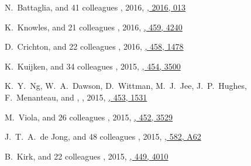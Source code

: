 \begin{etaremune}
\item
N.~Battaglia, and 41 colleagues
,
2016, \href{https://ui.adsabs.harvard.edu/abs/2016JCAP...08..013B}{\jcap, 2016, 013}

\item
K.~Knowles, and 21 colleagues
,
2016, \href{https://ui.adsabs.harvard.edu/abs/2016MNRAS.459.4240K}{\mnras, 459, 4240}

\item
D.~Crichton, and 22 colleagues
,
2016, \href{https://ui.adsabs.harvard.edu/abs/2016MNRAS.458.1478C}{\mnras, 458, 1478}

\item
K.~Kuijken, and 34 colleagues
,
2015, \href{https://ui.adsabs.harvard.edu/abs/2015MNRAS.454.3500K}{\mnras, 454, 3500}

\item
K.~Y.~Ng, W.~A.~Dawson, D.~Wittman, M.~J.~Jee, J.~P.~Hughes, F.~Menanteau, and \myself,
,
2015, \href{https://ui.adsabs.harvard.edu/abs/2015MNRAS.453.1531N}{\mnras, 453, 1531}

\item
M.~Viola, and 26 colleagues
,
2015, \href{https://ui.adsabs.harvard.edu/abs/2015MNRAS.452.3529V}{\mnras, 452, 3529}

\item
J.~T.~A.~de Jong, and 48 colleagues
,
2015, \href{https://ui.adsabs.harvard.edu/abs/2015A&A...582A..62D}{\aap, 582, A62}

\item
B.~Kirk, and 22 colleagues
,
2015, \href{https://ui.adsabs.harvard.edu/abs/2015MNRAS.449.4010K}{\mnras, 449, 4010}


\end{etaremune}
